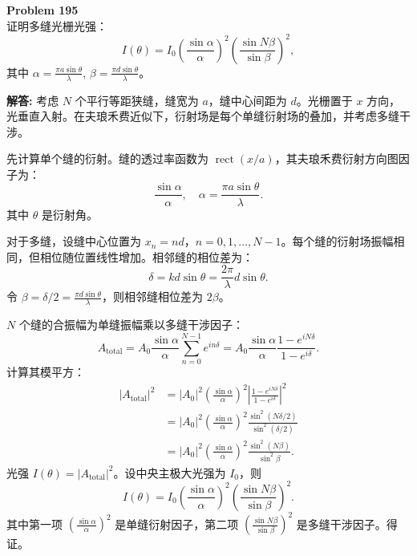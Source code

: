 \documentclass[12pt, a4paper, oneside]{ctexart}
\newenvironment{solution}{\par\noindent\textbf{解答:}\quad}{\par}
\begin{document}
\begin{mdframed}[backgroundcolor=gray!10, linewidth=0pt]
    \textbf{Problem 195} \\
    证明多缝光栅光强：
    \[
    I(\theta) = I_0 \left( \frac{\sin\alpha}{\alpha} \right)^2 \left( \frac{\sin N\beta}{\sin\beta} \right)^2,
    \]
    其中 $\alpha = \frac{\pi a \sin\theta}{\lambda}$, $\beta = \frac{\pi d \sin\theta}{\lambda}$。
\end{mdframed}
\begin{solution}
    考虑 $N$ 个平行等距狭缝，缝宽为 $a$，缝中心间距为 $d$。光栅置于 $x$ 方向，光垂直入射。在夫琅禾费近似下，衍射场是每个单缝衍射场的叠加，并考虑多缝干涉。

    先计算单个缝的衍射。缝的透过率函数为 $\operatorname{rect}(x/a)$，其夫琅禾费衍射方向图因子为：
    \[
    \frac{\sin\alpha}{\alpha}, \quad \alpha = \frac{\pi a \sin\theta}{\lambda}.
    \]
    其中 $\theta$ 是衍射角。

    对于多缝，设缝中心位置为 $x_n = n d$，$n=0,1,\dots,N-1$。每个缝的衍射场振幅相同，但相位随位置线性增加。相邻缝的相位差为：
    \[
    \delta = k d \sin\theta = \frac{2\pi}{\lambda} d \sin\theta.
    \]
    令 $\beta = \delta/2 = \frac{\pi d \sin\theta}{\lambda}$，则相邻缝相位差为 $2\beta$。

    $N$ 个缝的合振幅为单缝振幅乘以多缝干涉因子：
    \[
    A_{\text{total}} = A_0 \frac{\sin\alpha}{\alpha} \sum_{n=0}^{N-1} e^{i n \delta} = A_0 \frac{\sin\alpha}{\alpha} \frac{1 - e^{i N \delta}}{1 - e^{i \delta}}.
    \]
    计算其模平方：
    \begin{align*}
        |A_{\text{total}}|^2 &= |A_0|^2 \left( \frac{\sin\alpha}{\alpha} \right)^2 \left| \frac{1 - e^{i N \delta}}{1 - e^{i \delta}} \right|^2 \\
        &= |A_0|^2 \left( \frac{\sin\alpha}{\alpha} \right)^2 \frac{\sin^2(N\delta/2)}{\sin^2(\delta/2)} \\
        &= |A_0|^2 \left( \frac{\sin\alpha}{\alpha} \right)^2 \frac{\sin^2(N\beta)}{\sin^2\beta}.
    \end{align*}
    光强 $I(\theta) = |A_{\text{total}}|^2$。设中央主极大光强为 $I_0$，则
    \[
    I(\theta) = I_0 \left( \frac{\sin\alpha}{\alpha} \right)^2 \left( \frac{\sin N\beta}{\sin\beta} \right)^2.
    \]
    其中第一项 $\left( \frac{\sin\alpha}{\alpha} \right)^2$ 是单缝衍射因子，第二项 $\left( \frac{\sin N\beta}{\sin\beta} \right)^2$ 是多缝干涉因子。得证。
\end{solution}
\end{document}
